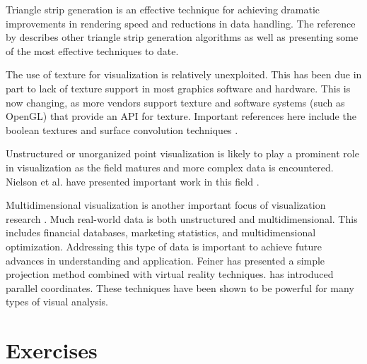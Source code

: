 Triangle strip generation is an effective technique for achieving dramatic improvements in rendering speed and reductions in data handling. The reference by \cite{Evans96} describes other triangle strip generation algorithms as well as presenting some of the most effective techniques to date.

The use of texture for visualization is relatively unexploited. This has been due in part to lack of texture support in most graphics software and hardware. This is now changing, as more vendors support texture and software systems (such as OpenGL) that provide an API for texture. Important references here include the boolean textures \cite{Lorensen93} and surface convolution techniques \cite{Cabral93} \cite{Stalling95}.

Unstructured or unorganized point visualization is likely to play a prominent role in visualization as the field matures and more complex data is encountered. Nielson et al. have presented important work in this field \cite{Nielson91a}.

Multidimensional visualization is another important focus of visualization research \cite{Bergeron89} \cite{Mihalisin90}. Much real-world data is both unstructured and multidimensional. This includes financial databases, marketing statistics, and multidimensional optimization. Addressing this type of data is important to achieve future advances in understanding and application. Feiner \cite{Feiner90} has presented a simple projection method combined with virtual reality techniques. \cite{Inselberg87} has introduced parallel coordinates. These techniques have been shown to be powerful for many types of visual analysis.

\printbibliography

\section{Exercises}

